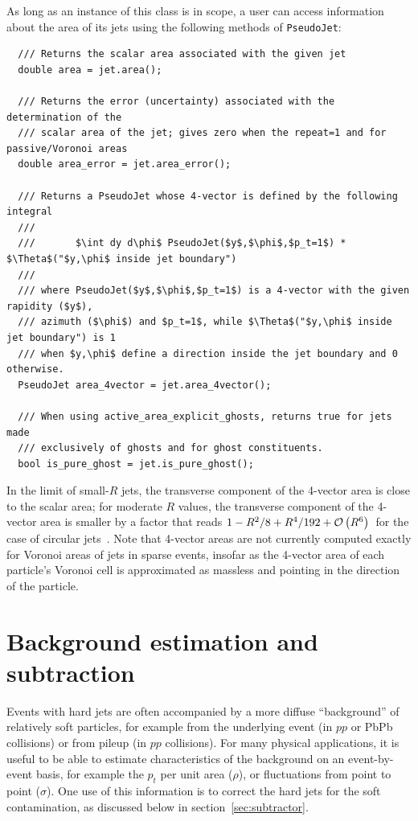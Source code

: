 \documentclass[12pt,a4]{article}
\newcommand{\ttt}[1]{{\small\texttt{#1}}}
\newcommand{\order}[1]{{\cal O}\left(#1\right)}
\begin{document}
As long as an instance of this class is in scope, a user can access
information about the area of its jets using the following methods of
\ttt{PseudoJet}:
\begin{lstlisting}
  /// Returns the scalar area associated with the given jet
  double area = jet.area();

  /// Returns the error (uncertainty) associated with the determination of the
  /// scalar area of the jet; gives zero when the repeat=1 and for passive/Voronoi areas
  double area_error = jet.area_error();

  /// Returns a PseudoJet whose 4-vector is defined by the following integral
  ///
  ///       $\int dy d\phi$ PseudoJet($y$,$\phi$,$p_t=1$) * $\Theta$("$y,\phi$ inside jet boundary")
  ///
  /// where PseudoJet($y$,$\phi$,$p_t=1$) is a 4-vector with the given rapidity ($y$),
  /// azimuth ($\phi$) and $p_t=1$, while $\Theta$("$y,\phi$ inside jet boundary") is 1 
  /// when $y,\phi$ define a direction inside the jet boundary and 0 otherwise.
  PseudoJet area_4vector = jet.area_4vector();

  /// When using active_area_explicit_ghosts, returns true for jets made 
  /// exclusively of ghosts and for ghost constituents.
  bool is_pure_ghost = jet.is_pure_ghost();
\end{lstlisting}
In the limit of small-$R$ jets, the transverse component of the
4-vector area is close to the scalar area; for moderate $R$ values,
the transverse component of the 4-vector area is smaller by a factor
that reads $1 - R^2/8 + R^4/192 + \order{R^6}$~for the case of
circular jets~\cite{Dasgupta:2007wa}.
%
Note that 4-vector areas are not currently computed exactly for
Voronoi areas of jets in sparse events, insofar as the 4-vector area
of each particle's Voronoi cell is approximated as massless and
pointing in the direction of the particle.

\section{Background estimation and subtraction}
\label{sec:BackgroundEstimator}

Events with hard jets are often accompanied by a more diffuse
``background'' of relatively soft particles, for example from the
underlying event (in $pp$ or PbPb collisions) or from pileup (in $pp$
collisions).
%
For many physical applications, it is useful to be able to
estimate characteristics of the background on an event-by-event basis,
for example the $p_t$ per unit area ($\rho$), or fluctuations from
point to point ($\sigma$).
%
One use of this information is to correct the hard jets for the soft
contamination, as discussed below in section~\ref{sec:subtractor}.
\end{document}
